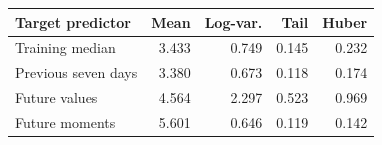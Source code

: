 \begin{tabular}{lrrrr}
\toprule
Target predictor & Mean & Log-var. & Tail & Huber \\
\midrule
Training median & 3.433 & 0.749 & 0.145 & 0.232 \\
Previous seven days & 3.380 & 0.673 & 0.118 & 0.174 \\
Future values & 4.564 & 2.297 & 0.523 & 0.969 \\
Future moments & 5.601 & 0.646 & 0.119 & 0.142 \\
\bottomrule
\end{tabular}